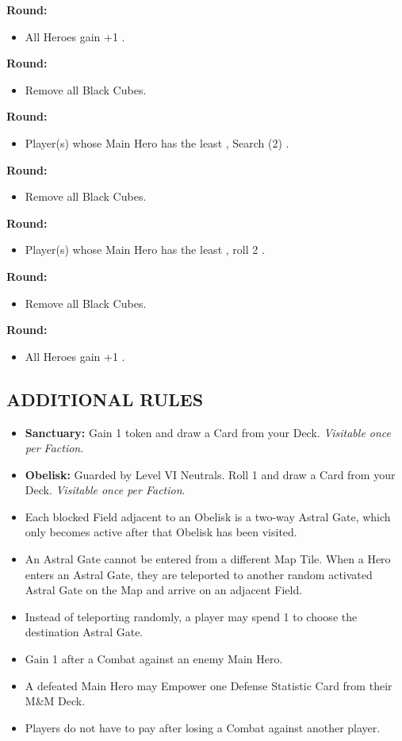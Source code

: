 \begin{multicols}{2}
\textbf{ Round:}
\begin{itemize}
  \item All Heroes gain +1 .
\end{itemize}
\textbf{ Round:}
\begin{itemize}
  \item Remove all Black Cubes.
\end{itemize}
\textbf{ Round:}
\begin{itemize}
  \item Player(s) whose Main Hero has the least , Search (2) .
\end{itemize}
\textbf{ Round:}
\begin{itemize}
  \item Remove all Black Cubes.
\end{itemize}
\textbf{ Round:}
\begin{itemize}
  \item Player(s) whose Main Hero has the least , roll 2 .
\end{itemize}
\columnbreak
\textbf{ Round:}
\begin{itemize}
  \item Remove all Black Cubes.
\end{itemize}
\textbf{ Round:}
\begin{itemize}
  \item All Heroes gain +1 .
\end{itemize}

\subsection*{\MakeUppercase{Additional Rules}}
\begin{itemize}
  \item \textbf{Sanctuary:} Gain 1  token and draw a Card from your Deck. \textit{Visitable once per Faction}.
  \item \textbf{Obelisk:} Guarded by Level VI Neutrals. Roll 1  and draw a Card from your Deck. \textit{Visitable once per Faction}.
  \item Each blocked Field adjacent to an Obelisk is a two-way Astral Gate, which only becomes active after that Obelisk has been visited.
  \item An Astral Gate cannot be entered from a different Map Tile. When a Hero enters an Astral Gate, they are teleported to another random activated Astral Gate on the Map and arrive on an adjacent Field.
  \item Instead of teleporting randomly, a player may spend 1  to choose the destination Astral Gate.
  \item Gain 1  after a Combat against an enemy Main Hero.
  \item A defeated Main Hero may Empower one Defense Statistic Card from their M\&M Deck.
  \item Players do not have to pay  after losing a Combat against another player.
\end{itemize}


\end{multicols}

